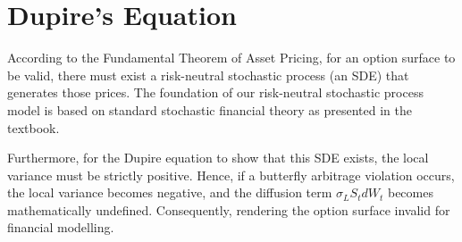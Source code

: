 \documentclass[12pt,oneside]{report}
\theoremstyle{definition}
\theoremstyle{remark}
\begin{document}

\section{Dupire’s Equation}
\label{sec:dupire_eq}

According to the Fundamental Theorem of Asset Pricing, for an option surface to be valid, there must exist a risk-neutral stochastic process (an SDE) that generates those prices. The foundation of our risk-neutral stochastic process model is based on standard stochastic financial theory as presented in the \citet{shreve2004stochastic} textbook. 

Furthermore, for the Dupire equation to show that this SDE exists, the local variance must be strictly positive. Hence, if a butterfly arbitrage violation occurs, the local variance becomes negative, and the diffusion term $\sigma_L S_t dW_t$ becomes mathematically undefined. Consequently, rendering the option surface invalid for financial modelling. 
\end{document}
